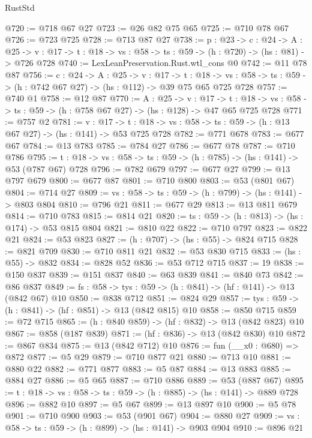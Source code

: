 \begin{lexlean}{RustStd}
\begin{coremodule}
@720 := @718 @67 @27
@723 := @26 @82 @75 @65
@725 := @710 @78 @67
@726 := @723 @725
@728 := @713 @87 @27
@738 := {p : @23} ->
  {c : @24} ->
  {A : @25} ->
  {v : @17} -> {t : @18} -> {vs : @58} -> {ts : @59} -> (h : @720) -> (hs : @81) -> @726 @728
@740 := LexLeanPreservation.Rust.wtl_cons @0
@742 := @11 @78 @87
@756 := {c : @24} ->
  {A : @25} ->
  {v : @17} ->
  {t : @18} ->
  {vs : @58} -> {ts : @59} -> (h : @742 @67 @27) -> (hs : @112) -> @39 @75 @65 @725 @728
@757 := @740 @1
@758 := @12 @87
@770 := {A : @25} ->
  {v : @17} ->
  {t : @18} -> {vs : @58} -> {ts : @59} -> (h : @758 @67 @27) -> (hs : @128) -> @47 @65 @725 @728
@771 := @757 @2
@781 := {v : @17} ->
  {t : @18} -> {vs : @58} -> {ts : @59} -> (h : @13 @67 @27) -> (hs : @141) -> @53 @725 @728
@782 := @771 @678
@783 := @677 @67
@784 := @13 @783
@785 := @784 @27
@786 := @677 @78
@787 := @710 @786
@795 := {t : @18} -> {vs : @58} -> {ts : @59} -> (h : @785) -> (hs : @141) -> @53 (@787 @67) @728
@796 := @782 @679
@797 := @677 @27
@799 := @13 @797 @679
@800 := @677 @87
@801 := @710 @800
@803 := @53 (@801 @67)
@804 := @714 @27
@809 := {vs : @58} -> {ts : @59} -> (h : @799) -> (hs : @141) -> @803 @804
@810 := @796 @21
@811 := @677 @29
@813 := @13 @811 @679
@814 := @710 @783
@815 := @814 @21
@820 := {ts : @59} -> (h : @813) -> (hs : @174) -> @53 @815 @804
@821 := @810 @22
@822 := @710 @797
@823 := @822 @21
@824 := @53 @823
@827 := (h : @707) -> (hs : @55) -> @824 @715
@828 := @821 @709
@830 := @710 @811 @21
@832 := @53 @830 @715
@833 := (hs : @55) -> @832
@834 := @828 @52
@836 := @53 @712 @715
@837 := 19
@838 := @150 @837
@839 := @151 @837
@840 := @63 @839
@841 := @840 @73
@842 := @86 @837
@849 := {fs : @58} -> {tys : @59} -> (h : @841) -> (hf : @141) -> @13 (@842 @67) @10
@850 := @838 @712
@851 := @824 @29
@857 := {tys : @59} -> (h : @841) -> (hf : @851) -> @13 (@842 @815) @10
@858 := @850 @715
@859 := @72 @715
@865 := (h : @840 @859) -> (hf : @832) -> @13 (@842 @823) @10
@867 := @858 (@187 @839)
@871 := (hf : @836) -> @13 (@842 @830) @10
@872 := @867 @834
@875 := @13 (@842 @712) @10
@876 := fun (__x0 : @680) => @872
@877 := @5 @29
@879 := @710 @877 @21
@880 := @713 @10
@881 := @880 @22
@882 := @771 @877
@883 := @5 @87
@884 := @13 @883
@885 := @884 @27
@886 := @5 @65
@887 := @710 @886
@889 := @53 (@887 @67)
@895 := {t : @18} -> {vs : @58} -> {ts : @59} -> (h : @885) -> (hs : @141) -> @889 @728
@896 := @882 @10
@897 := @5 @67
@899 := @13 @897 @10
@900 := @5 @78
@901 := @710 @900
@903 := @53 (@901 @67)
@904 := @880 @27
@909 := {vs : @58} -> {ts : @59} -> (h : @899) -> (hs : @141) -> @903 @904
@910 := @896 @21

\end{coremodule}
\end{lexlean}
